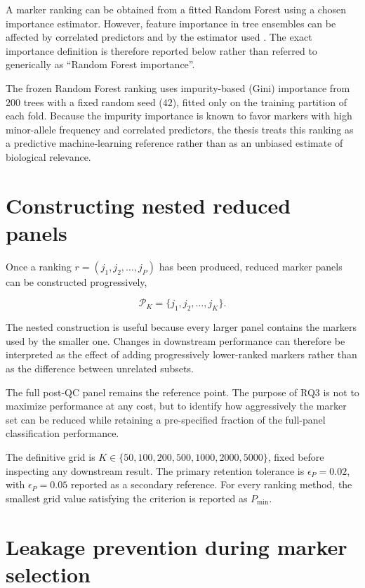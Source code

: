A marker ranking can be obtained from a fitted Random Forest using a
chosen importance estimator. However, feature importance in tree
ensembles can be affected by correlated predictors and by the
estimator used \cite{strobl2007bias, nicodemus2010correlation}. The
exact importance definition is therefore reported below rather than
referred to generically as ``Random Forest importance''.

The frozen Random Forest ranking uses impurity-based (Gini) importance
from $200$ trees with a fixed random seed ($42$), fitted only on the
training partition of each fold. Because the impurity importance is known
to favor markers with high minor-allele frequency and correlated
predictors, the thesis treats this ranking as a predictive
machine-learning reference rather than as an unbiased estimate of
biological relevance.

\section{Constructing nested reduced panels}
\label{sec:reduced_panel_construction}

Once a ranking
$r=(j_1,j_2,\ldots,j_P)$
has been produced, reduced marker panels can be constructed
progressively,

\begin{equation}
    \mathcal{P}_K
    =
    \{j_1,j_2,\ldots,j_K\}.
\end{equation}

The nested construction is useful because every larger panel contains
the markers used by the smaller one. Changes in downstream performance
can therefore be interpreted as the effect of adding progressively
lower-ranked markers rather than as the difference between unrelated
subsets.

The full post-QC panel remains the reference point. The purpose of RQ3
is not to maximize performance at any cost, but to identify how
aggressively the marker set can be reduced while retaining a
pre-specified fraction of the full-panel classification performance.

The definitive grid is $K \in \{50, 100, 200, 500, 1000, 2000, 5000\}$,
fixed before inspecting any downstream result. The primary retention
tolerance is $\epsilon_P = 0.02$, with $\epsilon_P = 0.05$ reported as
a secondary reference. For every ranking method, the smallest grid
value satisfying the criterion is reported as $P_{\min}$.

\section{Leakage prevention during marker selection}
\label{sec:marker_selection_leakage}

